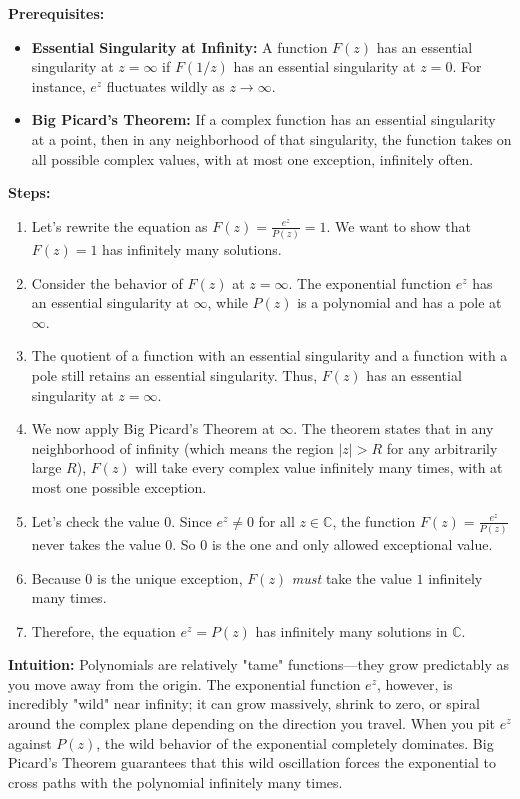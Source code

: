 \begin{solution}
\textbf{Prerequisites:}
\begin{itemize}
    \item \textbf{Essential Singularity at Infinity:} A function $F(z)$ has an essential singularity at $z = \infty$ if $F(1/z)$ has an essential singularity at $z = 0$. For instance, $e^z$ fluctuates wildly as $z \to \infty$.
    \item \textbf{Big Picard's Theorem:} If a complex function has an essential singularity at a point, then in any neighborhood of that singularity, the function takes on all possible complex values, with at most one exception, infinitely often.
\end{itemize}

\textbf{Steps:}
\begin{enumerate}
    \item Let's rewrite the equation as $F(z) = \frac{e^z}{P(z)} = 1$. We want to show that $F(z) = 1$ has infinitely many solutions.
    \item Consider the behavior of $F(z)$ at $z = \infty$. The exponential function $e^z$ has an essential singularity at $\infty$, while $P(z)$ is a polynomial and has a pole at $\infty$.
    \item The quotient of a function with an essential singularity and a function with a pole still retains an essential singularity. Thus, $F(z)$ has an essential singularity at $z = \infty$.
    \item We now apply Big Picard's Theorem at $\infty$. The theorem states that in any neighborhood of infinity (which means the region $|z| > R$ for any arbitrarily large $R$), $F(z)$ will take every complex value infinitely many times, with at most one possible exception.
    \item Let's check the value $0$. Since $e^z \neq 0$ for all $z \in \mathbb{C}$, the function $F(z) = \frac{e^z}{P(z)}$ never takes the value $0$. So $0$ is the one and only allowed exceptional value.
    \item Because $0$ is the unique exception, $F(z)$ \textit{must} take the value $1$ infinitely many times.
    \item Therefore, the equation $e^z = P(z)$ has infinitely many solutions in $\mathbb{C}$.
\end{enumerate}

\textbf{Intuition:}
Polynomials are relatively "tame" functions—they grow predictably as you move away from the origin. The exponential function $e^z$, however, is incredibly "wild" near infinity; it can grow massively, shrink to zero, or spiral around the complex plane depending on the direction you travel. When you pit $e^z$ against $P(z)$, the wild behavior of the exponential completely dominates. Big Picard's Theorem guarantees that this wild oscillation forces the exponential to cross paths with the polynomial infinitely many times.
\end{solution}

